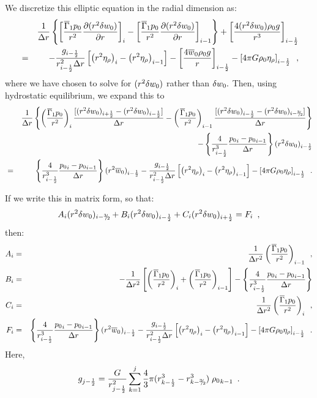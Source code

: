 \noindent We discretize this elliptic equation in the radial dimension as:
\begin{eqnarray}
&& \frac{1}{\Delta r} \left\{
\left[ \frac{\overline{\Gamma}_1 p_0}{r^2} \frac{\partial (r^2 \delta w_0)}{\partial r} \right]_{i} -
\left[ \frac{\overline{\Gamma}_1 p_0}{r^2} \frac{\partial (r^2 \delta w_0)}{\partial r} \right]_{i-1} \right\}
+ \left[ \frac{4 (r^2 \delta w_0) \rho_0 g}{r^3} \right]_{i-\frac{1}{2}} \nonumber\\
&=& 
- \frac{g_{i-\frac{1}{2}}}{r_{i-\frac{1}{2}}^2 \Delta r} 
\left[ \left( r^2 \eta_{\rho} \right)_{i} - \left( r^2 \eta_{\rho}  \right)_{i-1} \right] 
   - \left[ \frac{4 \overline{w}_0 \rho_0 g}{r} \right]_{i-\frac{1}{2}}
   - \left[  4 \pi G \rho_0 \eta_{\rho}   \right]_{i-\frac{1}{2}} \enskip , \nonumber
\end{eqnarray}
where we have chosen to solve for $(r^2 \delta w_0)$ rather than $\delta w_0.$
Then, using hydrostatic equilibrium, we expand this to 
\begin{eqnarray}
&& \frac{1}{\Delta r} \left\{
 \left( \frac{\gammabar p_0}{r^2}\right)_{i  } \frac{[ (r^2 \dw)_{i+\half} - (r^2 \dw)_{i-\half} ]}{\Delta r}
-\left( \frac{\gammabar p_0}{r^2}\right)_{i-1} \frac{[ (r^2 \dw)_{i-\half} - (r^2 \dw)_{i-\thalf}]}{\Delta r} \right\} \nonumber \\
&&  - \left\{ \frac{4}{r_{i-\half} ^3} \frac{{p_0}_i - {p_0}_{i-1}}{\dr} \right\} (r^2 \dw)_{i-\half}  \nonumber \\
&=&   \left\{ \frac{4}{r_{i-\half} ^3} \frac{{p_0}_i - {p_0}_{i-1}}{\dr} \right\} (r^2 \ow)_{i-\half}
 - \frac{g_{i-\half}}{r_{i-\half}^2 \Delta r} 
  \left[ \left( r^2 \etarho \right)_{i} - \left( r^2 \etarho  \right)_{i-1} \right] 
- \left[  4 \pi G \rhozero \etarho   \right]_{i-\half} \enskip.
\end{eqnarray}

If we write this in matrix form, so that:
\begin{equation}
A_i (r^2 \dw)_{i-\thalf} + B_i (r^2 \dw)_{i-\half} + C_i (r^2 \dw)_{i+\half} = F_i\enskip,
\end{equation}
then:
\begin{eqnarray}
A_i &=& \frac{1}{\Delta r^2} \left( \frac{\overline{\Gamma}_1 p_0}{r^2}\right)_{i-1}  \enskip, \nonumber  \\
B_i &=& -\frac{1}{\Delta r^2} \left[ \left( \frac{\overline{\Gamma}_1 p_0}{r^2}\right)_{i  }  
               +\left( \frac{\overline{\Gamma}_1 p_0}{r^2}\right)_{i-1} \right] 
              - \left\{ \frac{4}{r_{i-\frac{1}{2}} ^3} \frac{{p_0}_i - {p_0}_{i-1}}{\Delta r} \right\} \nonumber \\
C_i &=& \frac{1}{\Delta r^2} \left( \frac{\overline{\Gamma}_1 p_0}{r^2}\right)_{i}  \enskip, \nonumber  \\
F_i &=&  \left\{ \frac{4}{r_{i-\frac{1}{2}} ^3} \frac{{p_0}_i - {p_0}_{i-1}}{\Delta r} \right\} (r^2 \overline{w}_0)_{i-\frac{1}{2}}
 - \frac{g_{i-\frac{1}{2}}}{r_{i-\frac{1}{2}}^2 \Delta r} 
\left[ \left( r^2 \eta_{\rho} \right)_{i} - \left( r^2 \eta_{\rho}  \right)_{i-1} \right] 
- \left[  4 \pi G \rho_0 \eta_{\rho}   \right]_{i-\frac{1}{2}} \enskip \nonumber .
\end{eqnarray}
Here,
\begin{equation}
g_{j-\half} = \frac{G}{r_{j-\half}^2} \sum_{k=1}^{j} \frac{4}{3} \pi  (r_{k-\half}^3 - r_{k-\thalf}^3) \; {\rho_0}_{k-1} \enskip.
\end{equation}

